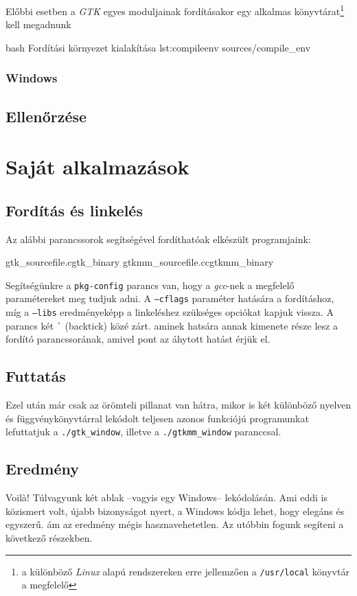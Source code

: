 Előbbi esetben a \textit{GTK} egyes moduljainak fordításakor egy alkalmas könyvtárat\footnote{a különböző \textit{Linux} alapú rendszereken erre jellemzően a \texttt{/usr/local} könyvtár a megfelelő} kell megadnunk 

\lstinputfile
{bash}
{Fordítási környezet kialakítása}
{lst:compileenv}
{sources/compile_env}

\subsubsection{Windows}

\subsection{Ellenőrzése}

\section{Saját alkalmazások}

\subsection{Fordítás és linkelés}
\label{sec:compilingandlinking}

Az alábbi parancssorok segítségével fordíthatóak elkészült programjaink:

\lstcompiles
{gtk\_sourcefile.c}{gtk\_binary}
{gtkmm\_sourcefile.cc}{gtkmm\_binary}

Segítségünkre a \texttt{pkg-config} parancs van, hogy a \textit{gcc}-nek a megfelelő paramétereket meg tudjuk adni. A \texttt{--cflags} paraméter hatására a fordításhoz, míg a \texttt{--libs} eredményeképp a linkeléshez szükséges opciókat kapjuk vissza. A parancs két \texttt{\`} (backtick) közé zárt. aminek hatsára annak kimenete része lesz a fordító parancssorának, amivel pont az áhytott hatást érjük el.

\subsection{Futtatás}

Ezel után már csak az örömteli pillanat van hátra, mikor is két különböző nyelven és függvénykönyvtárral lekódolt teljesen azonos funkciójú programunkat lefuttatjuk a \texttt{./gtk\_window}, illetve a \texttt{./gtkmm\_window} paranccsal.

\subsection{Eredmény}

Voil\`{a}! Túlvagyunk két ablak --vagyis egy Windows-- lekódolásán. Ami eddi is közismert volt, újabb bizonyságot nyert, a Windows kódja lehet, hogy elegáns és egyszerű. ám az eredmény mégis hasznavehetetlen. Az utóbbin fogunk segíteni a következő részekben.
